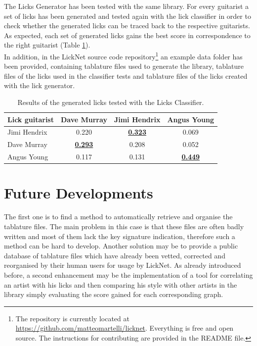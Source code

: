 \documentclass{llncs}
\begin{document}
The Licks Generator has been tested with the same library. For every
guitarist a set of licks has been generated and tested again with the lick 
classifier in order to check whether the generated licks
can be traced back to the respective guitarists. As expected, each set
of generated licks gains the best score in correspondence to the right
guitarist (Table \ref{tab:generator}).\\
In addition, in the LickNet source code repository\footnote{The
repository is currently located at
\url{https://github.com/matteomartelli/licknet}. Everything is free and open source.
The instructions for contributing are provided in the README file.}
 an example data folder has been provided, containing tablature files used
to generate the library, tablature files of the licks used in the
classifier tests and tablature files of the licks created with the
lick generator.
\begin{table}
\begin{center}
  \begin{tabular}{ l c c c }
    \hline
    Lick guitarist  & Dave Murray & Jimi Hendrix & Angus Young  \\ \hline
	Jimi Hendrix & 0.220 & \underline{\textbf{0.323}} & 0.069 \\
    Dave Murray & \underline{\textbf{0.293}} & 0.208 & 0.052 \\
	Angus Young & 0.117 & 0.131 & \underline{\textbf{0.449}} \\
  \end{tabular}
\end{center}
\caption{Results of the generated licks tested with the Licks Classifier.}
\label{tab:generator}
\end{table}

\section{Future Developments}
The first one is to find a method to automatically retrieve and
organise the tablature files. The main problem in this case is that these files are
often badly written and most of them lack the key signature indication,
therefore such a method can be hard to develop. 
Another solution
may be to provide a public database of tablature files which have already
been vetted, corrected and reorganised by their human users for usage by LickNet.
As already introduced before, a second enhancement may be the
implementation of a tool for
correlating an artist with his licks and then comparing his style with
other artists in the library simply evaluating the score gained for each
corresponding graph.
\end{document}
